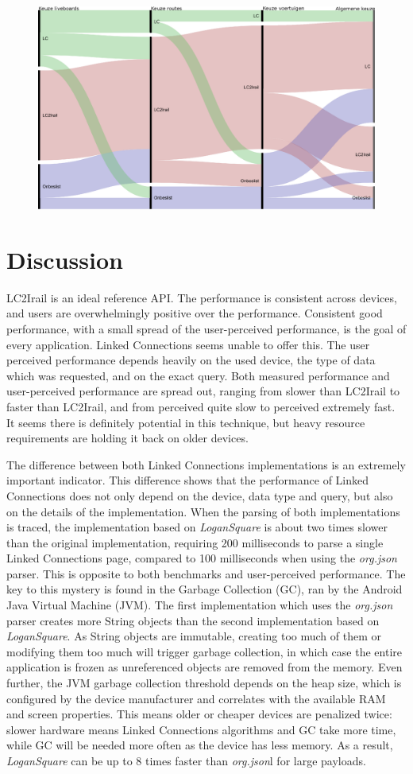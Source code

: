 \documentclass[twocolumn]{phdsymp} %
\begin{document}
\begin{figure}[ht]
	\begin{center}
		\includegraphics[width=.40\textwidth]{images/alluvial_user_choice.eps}
		\caption{\label{fig:choices} }
	\end{center}
\end{figure}


\section{Discussion}
LC2Irail is an ideal reference API. The performance is consistent across devices, and users are overwhelmingly positive over the performance. Consistent good performance, with a small spread of the user-perceived performance, is the goal of every application. Linked Connections seems unable to offer this. The user perceived performance depends heavily on the used device, the type of data which was requested, and on the exact query. Both measured performance and user-perceived performance are spread out, ranging from slower than LC2Irail to faster than LC2Irail, and from perceived quite slow to perceived extremely fast. It seems there is definitely potential in this technique, but heavy resource requirements are holding it back on older devices.

The difference between both Linked Connections implementations is an extremely important indicator. This difference shows that the performance of Linked Connections
does not only depend on the device, data type and query, but also on the details of the implementation. When the parsing of both implementations is traced, the implementation based on \emph{LoganSquare} is about two times slower than the original implementation, requiring 200 milliseconds to parse a single Linked Connections page, compared to 100 milliseconds when using the \emph{org.json} parser. This is opposite to both benchmarks and user-perceived performance. The key to this mystery is found in the Garbage Collection (GC), ran by the Android Java Virtual Machine (JVM). The first implementation which uses the \emph{org.json} parser creates more String objects than the second implementation based on \emph{LoganSquare}. As String objects are immutable, creating too much of them or modifying them too much will trigger garbage collection, in which case the entire application is frozen as unreferenced objects are removed from the memory. Even further, the JVM garbage collection threshold depends on the heap size, which is configured by the device manufacturer and correlates with the available RAM and screen properties. This
means older or cheaper devices are penalized twice: slower hardware means Linked Connections algorithms and GC take more time, while GC will be needed more often as the device has less memory. As a result, \emph{LoganSquare} can be up to 8 times faster than \emph{org.json}l for large payloads.
\end{document}
